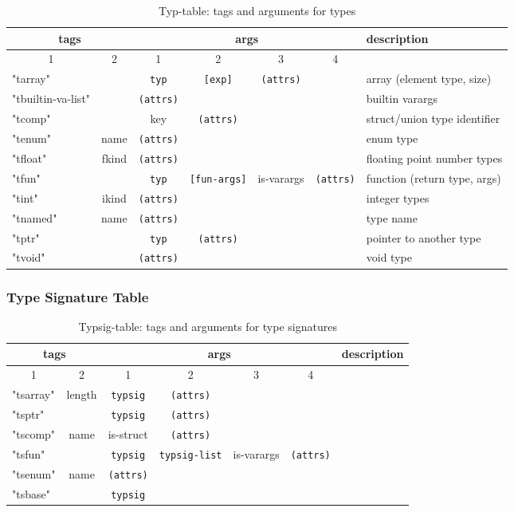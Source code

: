 \documentclass[11pt]{article}
\begin{document}
\begin{table}
\centering
\begin{tabular}{l|c||c|c|c|c||l}
\multicolumn{2}{c||}{tags} & \multicolumn{4}{|c||}{args} & description \\ \hline
\multicolumn{1}{c|}{1} & 2 & 1 & 2 & 3 & 4 & \\ \hline 
"tarray" & & {\tt typ} & {\tt [exp]} & {\tt (attrs)} & & array (element type, size) \\
"tbuiltin-va-list" & & {\tt (attrs)} & & & & builtin varargs \\
"tcomp" & & key & {\tt (attrs)} & & & struct/union type identifier \\
"tenum" & name & {\tt (attrs)} & & & & enum type \\
"tfloat" & fkind & {\tt (attrs)} & & & & floating point number types \\
"tfun" & & {\tt typ} & {\tt [fun-args]} & is-varargs & {\tt (attrs)} & function (return type, args) \\
"tint" & ikind & {\tt (attrs)}  & & & & integer types \\
"tnamed" & name & {\tt (attrs)} & & & & type name \\
"tptr" & & {\tt typ} & {\tt (attrs)} & & & pointer to another type \\
"tvoid" & & {\tt (attrs)}  & & & & void type \\ \hline
\end{tabular}
\caption{\label{tab:typtable}Typ-table: tags and arguments for types}
\end{table}

\subsubsection{Type Signature Table}

\begin{table}
\centering
\begin{tabular}{l|c||c|c|c|c||l}
\multicolumn{2}{c||}{tags} & \multicolumn{4}{|c||}{args} & description \\ \hline
\multicolumn{1}{c|}{1} & 2 & 1 & 2 & 3 & 4 & \\ \hline 
"tsarray" & length & {\tt typsig} & {\tt (attrs)} & & & \\
"tsptr" & & {\tt typsig} & {\tt (attrs)} & & & \\
"tscomp" & name & is-struct & {\tt (attrs)} & & \\
"tsfun" & & {\tt typsig} & {\tt typsig-list} & is-varargs & {\tt (attrs)} & \\
"tsenum" & name & {\tt (attrs)} & & & & \\
"tsbase" & & {\tt typsig} & & & &
\end{tabular}
\caption{\label{tab:typtable}Typsig-table: tags and arguments for type signatures}
\end{table}
\end{document}

